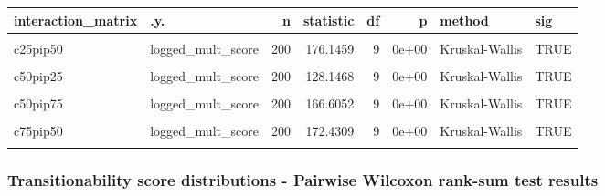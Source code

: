 \documentclass[
]{book}
\begin{document}
\begin{table}
\centering
\begin{tabular}{l|l|r|r|r|r|l|l}
\hline
interaction\_matrix & .y. & n & statistic & df & p & method & sig\\
\hline
\cellcolor{gray!6}{c25pip25} & \cellcolor{gray!6}{logged\_mult\_score} & \cellcolor{gray!6}{200} & \cellcolor{gray!6}{135.4711} & \cellcolor{gray!6}{9} & \cellcolor{gray!6}{0e+00} & \cellcolor{gray!6}{Kruskal-Wallis} & \cellcolor{gray!6}{TRUE}\\
\hline
c25pip50 & logged\_mult\_score & 200 & 176.1459 & 9 & 0e+00 & Kruskal-Wallis & TRUE\\
\hline
\cellcolor{gray!6}{c25pip75} & \cellcolor{gray!6}{logged\_mult\_score} & \cellcolor{gray!6}{200} & \cellcolor{gray!6}{172.1451} & \cellcolor{gray!6}{9} & \cellcolor{gray!6}{0e+00} & \cellcolor{gray!6}{Kruskal-Wallis} & \cellcolor{gray!6}{TRUE}\\
\hline
c50pip25 & logged\_mult\_score & 200 & 128.1468 & 9 & 0e+00 & Kruskal-Wallis & TRUE\\
\hline
\cellcolor{gray!6}{c50pip50} & \cellcolor{gray!6}{logged\_mult\_score} & \cellcolor{gray!6}{200} & \cellcolor{gray!6}{125.9629} & \cellcolor{gray!6}{9} & \cellcolor{gray!6}{0e+00} & \cellcolor{gray!6}{Kruskal-Wallis} & \cellcolor{gray!6}{TRUE}\\
\hline
c50pip75 & logged\_mult\_score & 200 & 166.6052 & 9 & 0e+00 & Kruskal-Wallis & TRUE\\
\hline
\cellcolor{gray!6}{c75pip25} & \cellcolor{gray!6}{logged\_mult\_score} & \cellcolor{gray!6}{200} & \cellcolor{gray!6}{141.7244} & \cellcolor{gray!6}{9} & \cellcolor{gray!6}{0e+00} & \cellcolor{gray!6}{Kruskal-Wallis} & \cellcolor{gray!6}{TRUE}\\
\hline
c75pip50 & logged\_mult\_score & 200 & 172.4309 & 9 & 0e+00 & Kruskal-Wallis & TRUE\\
\hline
\cellcolor{gray!6}{c75pip75} & \cellcolor{gray!6}{logged\_mult\_score} & \cellcolor{gray!6}{200} & \cellcolor{gray!6}{48.4034} & \cellcolor{gray!6}{9} & \cellcolor{gray!6}{2e-07} & \cellcolor{gray!6}{Kruskal-Wallis} & \cellcolor{gray!6}{TRUE}\\
\hline
\end{tabular}
\end{table}

\hypertarget{transitionability-score-distributions---pairwise-wilcoxon-rank-sum-test-results}{%
\subsubsection{Transitionability score distributions - Pairwise Wilcoxon rank-sum test results}\label{transitionability-score-distributions---pairwise-wilcoxon-rank-sum-test-results}}
\end{document}
